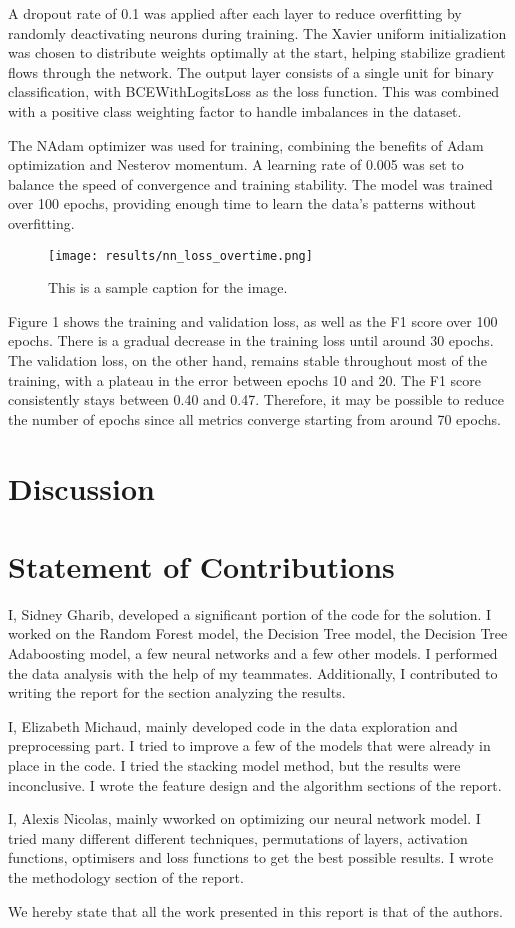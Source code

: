 \documentclass{article} %
\begin{document}
A dropout rate of 0.1 was applied after each layer to reduce overfitting by randomly deactivating neurons during training. The Xavier uniform initialization was chosen to distribute weights optimally at the start, helping stabilize gradient flows through the network. The output layer consists of a single unit for binary classification, with BCEWithLogitsLoss as the loss function. This was combined with a positive class weighting factor to handle imbalances in the dataset.

The NAdam optimizer was used for training, combining the benefits of Adam optimization and Nesterov momentum. A learning rate of 0.005 was set to balance the speed of convergence and training stability. The model was trained over 100 epochs, providing enough time to learn the data's patterns without overfitting.


\begin{figure}[ht!]
   \centering
   \texttt{[image: results/nn\_loss\_overtime.png]}
   \caption{This is a sample caption for the image.}
   \label{fig:sample-image}
\end{figure}

Figure 1 shows the training and validation loss, as well as the F1 score over 100 epochs. There is a gradual decrease in the training loss until around 30 epochs. The validation loss, on the other hand, remains stable throughout most of the training, with a plateau in the error between epochs 10 and 20. The F1 score consistently stays between 0.40 and 0.47. Therefore, it may be possible to reduce the number of epochs since all metrics converge starting from around 70 epochs.


\section{Discussion}

\section{Statement of Contributions}
\label{others}

I, Sidney Gharib, developed a significant portion of the code for the solution.
I worked on the Random Forest model, the Decision Tree model, the Decision Tree Adaboosting model, a few neural networks and a few other models.
I performed the data analysis with the help of my teammates. Additionally, I contributed to writing the report for the section analyzing the results.

I, Elizabeth Michaud, mainly developed code in the data exploration and preprocessing part. I tried to improve a few of the models that were already 
in place in the code. I tried the stacking model method, but the results were inconclusive. I wrote the feature design and the algorithm sections of 
the report. 

I, Alexis Nicolas, mainly wworked on optimizing our neural network model.
I tried many different different techniques, permutations of layers, activation functions, optimisers and loss functions
to get the best possible results.
I wrote the methodology section of the report.

We hereby state that all the work presented in this report is that of the authors.
\end{document}
